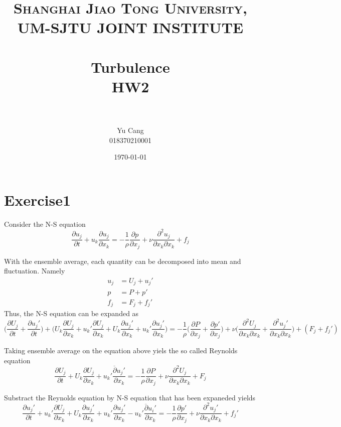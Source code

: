\documentclass[paper=a4, fontsize=11pt]{scrartcl} %
\title{	
\normalfont \normalsize 
\textsc{Shanghai Jiao Tong University, UM-SJTU JOINT INSTITUTE} \\ [25pt] %
\horrule{0.5pt} \\[0.4cm] %
\huge Turbulence \\ HW2 \\ %
\horrule{2pt} \\[0.5cm] %
}
\author{Yu Cang \\ 018370210001}
\date{\normalsize \today}
\numberwithin{equation}{section} %
\numberwithin{figure}{section} %
\numberwithin{table}{section} %
\begin{document}
\maketitle

\section{Exercise1}
	Consider the N-S equation
	\begin{equation}
		\frac{\partial u_j}{\partial t} + u_k \frac{\partial u_j}{\partial x_k} = -\frac{1}{\rho}\frac{\partial p}{\partial x_j} + \nu \frac{\partial^2 u_j}{\partial x_k \partial x_k} + f_j
	\end{equation}
	
	With the ensemble average, each quantity can be decomposed into mean and fluctuation. Namely
	\begin{equation}
		\begin{aligned}
			u_j & = U_j + u_j'\\
			p & = P + p'\\
			f_j &= F_j + f_j'
		\end{aligned}
	\end{equation}
	Thus, the N-S equation can be expanded as
	\begin{equation}
		\Bigg(\frac{\partial U_j}{\partial t} + \frac{\partial u_j'}{\partial t}\Bigg) + \Bigg(U_k\frac{\partial U_j}{\partial x_k} + u_k'\frac{\partial U_j}{\partial x_k} + U_k \frac{\partial u_j'}{\partial x_k} + u_k'\frac{\partial u_j'}{\partial x_k}\Bigg) = -\frac{1}{\rho}\Bigg(\frac{\partial P}{\partial x_j} + \frac{\partial p'}{\partial x_j}\Bigg) + \nu \Bigg(\frac{\partial^2 U_j}{\partial x_k \partial x_k} + \frac{\partial^2 u_j'}{\partial x_k \partial x_k}\Bigg) + (F_j + f_j')
	\end{equation}
	
	Taking ensemble average on the equation above yiels the so called Reynolds equation
	\begin{equation}
		\frac{\partial U_j}{\partial t} + U_k \frac{\partial U_j}{\partial x_k} + \overline{u_k'\frac{\partial u_j'}{\partial x_k}} = -\frac{1}{\rho}\frac{\partial P}{\partial x_j} + \nu \frac{\partial^2 U_j}{\partial x_k \partial x_k} + F_j
	\end{equation}
	
	Substract the Reynolds equation by N-S equation that has been expaneded yields
	\begin{equation}
		\frac{\partial u_j'}{\partial t} + u_k'\frac{\partial U_j}{\partial x_k} + U_k \frac{\partial u_j'}{\partial x_k} + u_k'\frac{\partial u_j'}{\partial x_k} - \overline{u_k'\frac{\partial u_i'}{\partial x_k}} = -\frac{1}{\rho}\frac{\partial p'}{\partial x_j} + \nu \frac{\partial^2 u_j'}{\partial x_k \partial x_k} + f_j'
	\end{equation}
	
\end{document}
